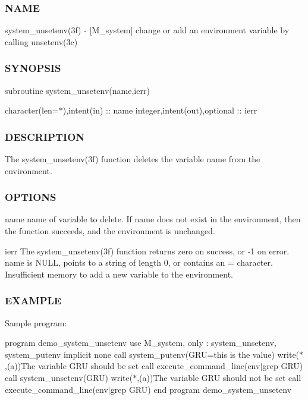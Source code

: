 \subsubsection*{N\+A\+ME}

system\+\_\+unsetenv(3f) -\/ \mbox{[}M\+\_\+system\mbox{]} change or add an environment variable by calling unsetenv(3c) \subsubsection*{S\+Y\+N\+O\+P\+S\+IS}

subroutine system\+\_\+unsetenv(name,ierr)

character(len=$\ast$),intent(in) \+:\+: name integer,intent(out),optional \+:\+: ierr

\subsubsection*{D\+E\+S\+C\+R\+I\+P\+T\+I\+ON}

\begin{DoxyVerb}The system_unsetenv(3f) function deletes the variable name from the
environment.
\end{DoxyVerb}


\subsubsection*{O\+P\+T\+I\+O\+NS}

name name of variable to delete. If name does not exist in the environment, then the function succeeds, and the environment is unchanged.

ierr The system\+\_\+unsetenv(3f) function returns zero on success, or -\/1 on error. name is N\+U\+LL, points to a string of length 0, or contains an \textquotesingle{}=\textquotesingle{} character. Insufficient memory to add a new variable to the environment.

\subsubsection*{E\+X\+A\+M\+P\+LE}

Sample program\+:

program demo\+\_\+system\+\_\+unsetenv use M\+\_\+system, only \+: system\+\_\+unsetenv, system\+\_\+putenv implicit none call system\+\_\+putenv(\textquotesingle{}G\+RU=this is the value\textquotesingle{}) write($\ast$,\textquotesingle{}(a)\textquotesingle{})\textquotesingle{}The variable G\+RU should be set\textquotesingle{} call execute\+\_\+command\+\_\+line(\textquotesingle{}env$\vert$grep G\+RU\textquotesingle{}) call system\+\_\+unsetenv(\textquotesingle{}G\+RU\textquotesingle{}) write($\ast$,\textquotesingle{}(a)\textquotesingle{})\textquotesingle{}The variable G\+RU should not be set\textquotesingle{} call execute\+\_\+command\+\_\+line(\textquotesingle{}env$\vert$grep G\+RU\textquotesingle{}) end program demo\+\_\+system\+\_\+unsetenv 

